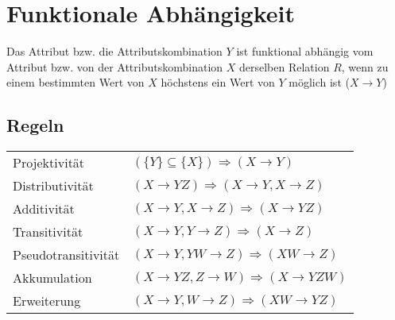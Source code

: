 \section{Funktionale Abhängigkeit}
Das Attribut bzw. die Attributskombination $Y$ ist funktional abhängig vom
Attribut bzw. von der Attributskombination $X$ derselben Relation $R$, wenn
zu einem bestimmten Wert von $X$ höchstens ein Wert von $Y$ möglich ist ($X \rightarrow Y$)

\subsection{Regeln}
\settowidth{\MyLenA}{Pseudotransitivität~~}
\begin{tabular}{
	@{}p{\the\MyLenA}%
	@{}p{\linewidth-\the\MyLenA}}
	Projektivität & $(\{Y\} \subseteq \{X\}) \Rightarrow (X \rightarrow Y)$\\
	Distributivität & $(X \rightarrow YZ) \Rightarrow (X \rightarrow Y, X \rightarrow Z)$\\
	Additivität & $(X \rightarrow Y, X \rightarrow Z) \Rightarrow (X \rightarrow YZ)$\\
	Transitivität & $(X \rightarrow Y, Y \rightarrow Z) \Rightarrow (X \rightarrow Z)$\\
	Pseudotransitivität & $(X \rightarrow Y, YW \rightarrow Z) \Rightarrow (XW \rightarrow Z)$\\
	Akkumulation & $(X \rightarrow YZ, Z \rightarrow W) \Rightarrow (X \rightarrow YZW)$\\
	Erweiterung & $(X \rightarrow Y, W \rightarrow Z) \Rightarrow (XW \rightarrow YZ)$\\
\end{tabular}
